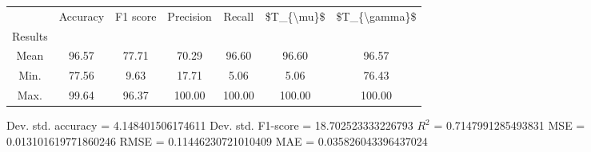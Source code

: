 \begin{tabular}{|c|c|c|c|c|c|c|}
\toprule
{} &  Accuracy &  F1 score &  Precision &  Recall &  \$T\_\{\textbackslash mu\}\$ &  \$T\_\{\textbackslash gamma\}\$ \\
Results &           &           &            &         &            &               \\
\hline
Mean    &     96.57 &     77.71 &      70.29 &   96.60 &      96.60 &         96.57 \\
Min.    &     77.56 &      9.63 &      17.71 &    5.06 &       5.06 &         76.43 \\
Max.    &     99.64 &     96.37 &     100.00 &  100.00 &     100.00 &        100.00 \\
\bottomrule
\end{tabular}

 Dev. std. accuracy = 4.148401506174611
 Dev. std. F1-score = 18.702523333226793
 $R^2$ = 0.7147991285493831
 MSE = 0.013101619771860246
 RMSE = 0.11446230721010409
 MAE = 0.035826043396437024